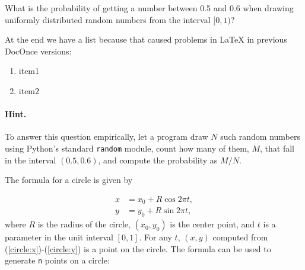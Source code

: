 \documentclass[%
oneside,                 %
final,                   %
10pt]{article}
\newenvironment{doconceexercise}{}{}
\newcounter{doconceexercisecounter}
\theoremstyle{definition}
\begin{document}
\begin{enumerate}
\begin{doconceexercise}
\end{doconceexercise}

\begin{doconceexercise}

                             
\label{demo:ex:2}


What is the probability of getting a number between 0.5 and 0.6 when
drawing uniformly distributed random numbers from the interval $[0,1)$?

At the end we have a list because that caused problems in {\LaTeX}
in previous DocOnce versions:

\begin{enumerate}
\item item1

\item item2
\end{enumerate}

\noindent

\paragraph{Hint.}
To answer this question empirically, let a program
draw $N$ such random numbers using Python's standard \texttt{random} module,
count how many of them, $M$, that fall in the interval $(0.5,0.6)$, and
compute the probability as $M/N$.


\end{doconceexercise}

\begin{doconceexercise}

                             
\label{proj:circle1}

The formula for a circle is given by

\begin{align}
x &= x_0 + R\cos 2\pi t,
\label{circle:x}\\ 
y &= y_0 + R\sin 2\pi t,
\label{circle:y}
\end{align}
where $R$ is the radius of the circle, $(x_0,y_0)$ is the
center point, and $t$ is a parameter in the unit interval $[0,1]$.
For any $t$, $(x,y)$ computed from (\ref{circle:x})-(\ref{circle:y})
is a point on the circle.
The formula can be used to generate \texttt{n} points on a circle:












\end{doconceexercise}
\end{enumerate}
\end{document}
